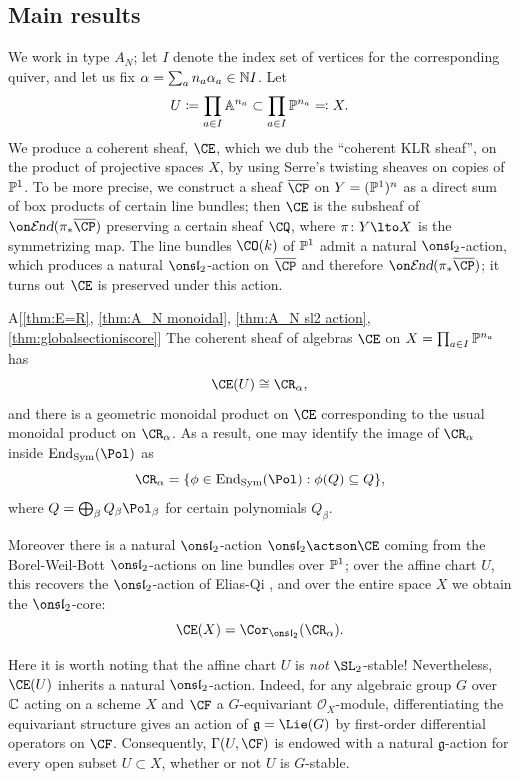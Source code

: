 \documentclass[11pt,reqno]{amsart}
\begin{document}
\subsection{Main results}
We work in type $A_N$; let $I$ denote the index set of vertices for the corresponding quiver, and let us fix $\alpha=\sum_a n_a\alpha_a \in \mathbb N I$. Let 
\[U\coloneqq \prod_{a\in I}\mathbb A^{n_a}\subset \prod_{a\in I} \mathbb P^{n_a}\eqqcolon X.\]
We produce a coherent sheaf, $\CE$, which we dub the ``coherent KLR sheaf'', on the product of projective spaces $X$, by using Serre's twisting sheaves on copies of $\mathbb P^1$. To be more precise, we construct a sheaf $\ol\CP$ on $Y=(\mathbb P^1)^n$ as a direct sum of box products of certain line bundles; then $\CE$ is the subsheaf of $\shend(\pi_*\ol\CP)$ preserving a certain sheaf $\CQ$, where $\pi\colon Y\lto X$ is the symmetrizing map. The line bundles $\CO(k)$ of $\mathbb P^1$ admit a natural $\sl_2$-action, which produces a natural $\sl_2$-action on $\ol\CP$ and therefore $\shend(\pi_*\ol\CP)$; it turns out $\CE$ is preserved under this action.
\begin{mytheorem}{A}[\ref{thm:E=R}, \ref{thm:A_N monoidal}, \ref{thm:A_N sl2 action}, \ref{thm:globalsectioniscore}]\label{thm:A}
    The coherent sheaf of algebras $\CE$ on $X=\prod_{a\in I} \mathbb P^{n_a}$ has
    \[\CE(U)\cong\CR_\alpha,\]
    and there is a geometric monoidal product on $\CE$ corresponding to the usual monoidal product on $\CR_\alpha$. As a result, one may identify the image of $\CR_\alpha$ inside $\End_{\Sym}(\Pol)$ as 
    \[\CR_\alpha=\{\phi\in\End_{\Sym}(\Pol):\phi(Q)\subseteq Q\},\]
    where $Q=\bigoplus_\beta Q_\beta\Pol_\beta$ for certain polynomials $Q_\beta$.
    
    Moreover there is a natural $\sl_2$-action $\sl_2\actson \CE$ coming from the Borel-Weil-Bott $\sl_2$-actions on line bundles over $\mathbb P^1$; over the affine chart $U$, this recovers the $\sl_2$-action of Elias-Qi \cite{EQ23}, and over the entire space $X$ we obtain the $\sl_2$-core:
    \[\CE(X)=\Cor_{\sl_2}(\CR_{\alpha}).\]
\end{mytheorem}

Here it is worth noting that the affine chart $U$ is \textit{not} $\SL_2$-stable! Nevertheless, $\CE(U)$ inherits a natural $\sl_2$-action. Indeed, for any algebraic group $G$ over $\mathbb C$ acting on a scheme $X$ and $\CF$ a $G$-equivariant $\mathcal O_X$-module, differentiating the equivariant structure gives an action of $\mathfrak g=\Lie(G)$ by first-order differential operators on $\CF$. Consequently, $\Gamma(U,\CF)$ is endowed with a natural $\mathfrak g$-action for every open subset $U\subset X$, whether or not $U$ is $G$-stable.
\end{document}
